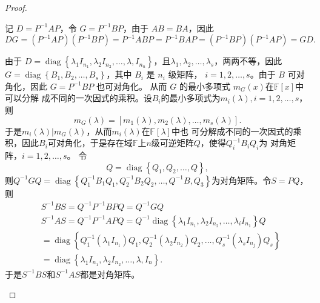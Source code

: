 \begin{enumerate}[1~]
\begin{proof}
\begin{subproof}
记 $D=P^{-1}AP$，令 $G=P^{-1}BP$，由于 $AB=BA$，因此\[
D G = \left( P ^ { - 1 } A P \right) \left( P ^ { - 1 } B P \right) = P ^ { - 1 } A B P = P ^ { - 1 } B A P = \left( P ^ { - 1 } B P \right) \left( P ^ { - 1 } A P \right) = G D.
\]

由于 $D = \operatorname { diag } \left\{ \lambda _ { 1 } I _{ n _ { 1 } } , \lambda _ { 2 } I _ { n _ { 2 } } , \dotsc , 
\lambda , I _ { n _ { n } } \right\}$，且$\lambda _ { 1 } , 
\lambda _ { 2 } , \dotsc , \lambda _ { s }$，两两不等，因此
$G = \operatorname { diag } \left\{ B _ { 1 } , B _ { 2 } , 
\dotsc , B _ { s } \right\}$，其中 $B_i$ 是 $n_i$ 级矩阵，
$i=1, 2, \dotsc, s$。由于 $B$ 可对角化，因此 $G=P^{-1}BP$ 也可对角化。
从而 $G$ 的最小多项式 $m_G(x)$在$\mathbb{F}[x]$中可以分解
成不同的一次因式的乘积。设$B_i$的最小多项式为$m_i(\lambda), i=1, 2, \dotsc, s$，则\[
m _ { G } ( \lambda ) = \left[ m _ { 1 } ( \lambda ) , m _ { 2 } ( \lambda ) , \dotsc , m _ { s } ( \lambda ) \right].
\]
于是$m _ { i } ( \lambda ) \left| m _ { G } ( \lambda )
\right.$，从而$m_i(\lambda)$在$\mathbb{F}[\lambda]$中也
可分解成不同的一次因式的乘积，因此$B_i$可对角化，于是存在域$
\mathbb{F}$上$n$级可逆矩阵$Q$，使得$Q_i^{-1}B_iQ_i$为
对角矩阵，$i=1, 2, \dotsc, s$。
令\[
 { Q } = \operatorname { diag } \left\{  { Q } _ { 1 } ,  { Q } _ { 2 } , \dotsc ,  { Q } \right\},
\]
则$Q ^ { - 1 } G Q = \operatorname { diag } \left\{ Q _ { 1 } ^ { - 1 } B _ { 1 } Q _ { 1 } , Q _ { 2 } ^ { - 1 } B _ { 2 } Q _ { 2 } , \dotsc , Q ^ { - 1 } B , Q _ { 3 } \right\}$为对角矩阵。令$S=PQ$，则\begin{align*}
&S ^ { - 1 } B S = Q ^ { - 1 } P ^ { - 1 } B P Q = Q ^ { - 1 } G Q\\
&S ^ { - 1 } A S = Q ^ { - 1 } P ^ { - 1 } A P Q = Q ^ { - 1 } \operatorname { diag } \left\{ \lambda _ { 1 } I _ { n _ { 1 } } , \lambda _ { 2 } I _ { n _ { 2 } } , \dotsc , \lambda _ { i } I _ { n _ { 1 } } \right\} Q\\
&= \operatorname { diag } \left\{ Q _ { 1 } ^ { - 1 } \left( \lambda _ { 1 } I _ { n _ { 1 } } \right) Q _ { 1 } , Q _ { 2 } ^ { - 1 } \left( \lambda _ { 2 } I _ { n _ { 2 } } \right) Q _ { 2 } , \dotsc , Q _ { s } ^ { - 1 } \left( \lambda _ { s } I _ { n _ { j } } \right) Q _ { s } \right\}\\
&= \operatorname { diag } \left\{ \lambda _ { 1 } I _ { n _ { 1 } } , \lambda _ { 2 } I _ { n _ { 2 } } , \dotsc , \lambda , I _ { n } \right\}.
\end{align*}
于是$S^{-1}BS$和$S^{-1}AS$都是对角矩阵。
\end{subproof}


\end{proof}
\end{enumerate}

